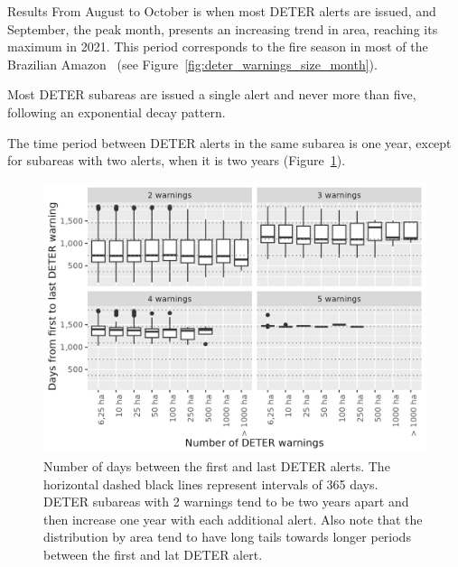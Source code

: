 \documentclass[20pt]{beamer}
\begin{document}
\begin{frame}[fragile,t]
\begin{columns}[t]
\begin{column}{0.33\linewidth}
\begin{block}{Results\vphantom{g}}
From August to October is when most DETER alerts are issued, and September, the peak month, presents an increasing trend in area, reaching its maximum in 2021.
This period corresponds to the fire season in most of the Brazilian Amazon~\cite{carvalho2021} (see Figure~\ref{fig:deter_warnings_size_month}). 


Most DETER subareas are issued a single alert and never more than five, following an exponential decay pattern.



The time period between DETER alerts in the same subarea is one year, except for subareas with two alerts, when it is two years (Figure~\ref{fig:plot_days_first_to_last}). 

\begin{figure}[h] 
    \begin{center}
        \includegraphics[width=\linewidth]{./figures/plot_days_first_to_last.png}
    \caption{Number of days between the first and last DETER alerts. The
        horizontal dashed black lines represent intervals of 365 days.
        DETER subareas with 2 warnings tend to be two years apart and then
        increase one year with each additional alert. Also note that the
        distribution by area tend to have long tails towards longer periods
        between the first and lat DETER alert.}
    \label{fig:plot_days_first_to_last}
    \end{center}
\end{figure}


\end{block}
\end{column}
\end{columns}
\end{frame}
\end{document}
